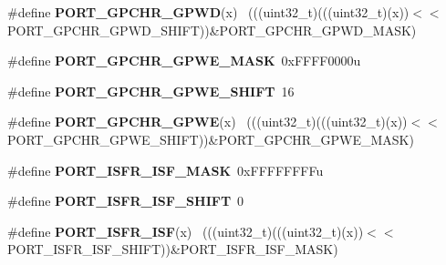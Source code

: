 \begin{DoxyCompactItemize}
\item 
\hypertarget{group___p_o_r_t___register___masks_ga4bcc0d29943f201d35379c59dced6f5a}{}\#define {\bfseries P\+O\+R\+T\+\_\+\+G\+P\+C\+H\+R\+\_\+\+G\+P\+W\+D}(x)                                          ~(((uint32\+\_\+t)(((uint32\+\_\+t)(x))$<$$<$P\+O\+R\+T\+\_\+\+G\+P\+C\+H\+R\+\_\+\+G\+P\+W\+D\+\_\+\+S\+H\+I\+F\+T))\&P\+O\+R\+T\+\_\+\+G\+P\+C\+H\+R\+\_\+\+G\+P\+W\+D\+\_\+\+M\+A\+S\+K)\label{group___p_o_r_t___register___masks_ga4bcc0d29943f201d35379c59dced6f5a}

\item 
\hypertarget{group___p_o_r_t___register___masks_ga5e60b77e9d69fc09654c8034e31df7b5}{}\#define {\bfseries P\+O\+R\+T\+\_\+\+G\+P\+C\+H\+R\+\_\+\+G\+P\+W\+E\+\_\+\+M\+A\+S\+K}~0x\+F\+F\+F\+F0000u\label{group___p_o_r_t___register___masks_ga5e60b77e9d69fc09654c8034e31df7b5}

\item 
\hypertarget{group___p_o_r_t___register___masks_gacbc69d159ff1e697736d296bbc95566d}{}\#define {\bfseries P\+O\+R\+T\+\_\+\+G\+P\+C\+H\+R\+\_\+\+G\+P\+W\+E\+\_\+\+S\+H\+I\+F\+T}~16\label{group___p_o_r_t___register___masks_gacbc69d159ff1e697736d296bbc95566d}

\item 
\hypertarget{group___p_o_r_t___register___masks_gae9cf8d5289e6249274584e60f984663b}{}\#define {\bfseries P\+O\+R\+T\+\_\+\+G\+P\+C\+H\+R\+\_\+\+G\+P\+W\+E}(x)                                          ~(((uint32\+\_\+t)(((uint32\+\_\+t)(x))$<$$<$P\+O\+R\+T\+\_\+\+G\+P\+C\+H\+R\+\_\+\+G\+P\+W\+E\+\_\+\+S\+H\+I\+F\+T))\&P\+O\+R\+T\+\_\+\+G\+P\+C\+H\+R\+\_\+\+G\+P\+W\+E\+\_\+\+M\+A\+S\+K)\label{group___p_o_r_t___register___masks_gae9cf8d5289e6249274584e60f984663b}

\item 
\hypertarget{group___p_o_r_t___register___masks_gabb5d188f3dfe38f0d8bbb870e81fb7e3}{}\#define {\bfseries P\+O\+R\+T\+\_\+\+I\+S\+F\+R\+\_\+\+I\+S\+F\+\_\+\+M\+A\+S\+K}~0x\+F\+F\+F\+F\+F\+F\+F\+Fu\label{group___p_o_r_t___register___masks_gabb5d188f3dfe38f0d8bbb870e81fb7e3}

\item 
\hypertarget{group___p_o_r_t___register___masks_ga678f290447622562272513d57eb2bf78}{}\#define {\bfseries P\+O\+R\+T\+\_\+\+I\+S\+F\+R\+\_\+\+I\+S\+F\+\_\+\+S\+H\+I\+F\+T}~0\label{group___p_o_r_t___register___masks_ga678f290447622562272513d57eb2bf78}

\item 
\hypertarget{group___p_o_r_t___register___masks_ga0cef94247261ca16ebf25b6f432f1344}{}\#define {\bfseries P\+O\+R\+T\+\_\+\+I\+S\+F\+R\+\_\+\+I\+S\+F}(x)                                              ~(((uint32\+\_\+t)(((uint32\+\_\+t)(x))$<$$<$P\+O\+R\+T\+\_\+\+I\+S\+F\+R\+\_\+\+I\+S\+F\+\_\+\+S\+H\+I\+F\+T))\&P\+O\+R\+T\+\_\+\+I\+S\+F\+R\+\_\+\+I\+S\+F\+\_\+\+M\+A\+S\+K)\label{group___p_o_r_t___register___masks_ga0cef94247261ca16ebf25b6f432f1344}


\end{DoxyCompactItemize}
